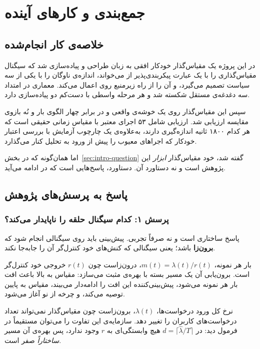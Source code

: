 \chapter{جمع‌بندی و کارهای آینده}
\label{ch:conclusion}

\section{خلاصه‌ی کار انجام‌شده}
\label{sec:conclusion-summary}

در این پروژه یک مقیاس‌گذار خودکار افقی به زبان  طراحی و پیاده‌سازی شد که سیگنال
مقیاس‌گذاری را با یک عبارت  پیکربندی‌پذیر از  می‌خواند، اندازه‌ی
ناوگان را با یکی از سه سیاست تصمیم می‌گیرد، و آن را از راه زیرمنبع  روی
 اعمال می‌کند. معماری در امتداد سه دغدغه‌ی مستقل شکسته شد و هر مرحله واسطی با
دست‌کم دو پیاده‌سازی دارد.

سپس این مقیاس‌گذار روی یک خوشه‌ی واقعی و در برابر چهار الگوی بار و نُه بازوی مقایسه ارزیابی
شد. ارزیابی شامل ۵۳ اجرای معتبر با مقیاس زمانی حقیقی است که هر کدام ۱۸۰۰ ثانیه اندازه‌گیری
دارند، به‌علاوه‌ی یک چارچوب آزمایش با بررسی اعتبار خودکار که اجراهای معیوب را پیش از ورود به
تحلیل کنار می‌گذارد.

اما همان‌گونه که در بخش~\ref{sec:intro-question} گفته شد، خود مقیاس‌گذار \emph{ابزار} این
پژوهش است و نه دستاورد آن. دستاورد، پاسخ‌هایی است که در ادامه می‌آید.

\section{پاسخ به پرسش‌های پژوهش}
\label{sec:conclusion-answers}

\subsection*{پرسش ۱: کدام سیگنال حلقه را ناپایدار می‌کند؟}

پاسخ ساختاری است و نه صرفاً تجربی. پیش‌بینی باید روی سیگنالی انجام شود که
\textbf{برون‌زا} باشد؛ یعنی سیگنالی که کنش‌های خود کنترل‌گر آن را جابه‌جا نکند.

بار هر نمونه، $m(t) = \lambda(t)/r(t)$، درون‌زاست چون $r(t)$ خروجی خود کنترل‌گر است.
برون‌یابی آن یک مسیر بسته با بهره‌ی مثبت می‌سازد: مقیاس به بالا باعث افت بار هر نمونه
می‌شود، پیش‌بینی‌کننده این افت را ادامه‌دار می‌بیند، مقیاس به پایین توصیه می‌کند، و چرخه از
نو آغاز می‌شود.

نرخ کل ورود درخواست‌ها، $\lambda(t)$، برون‌زاست چون مقیاس‌گذار نمی‌تواند تعداد درخواست‌های
کاربران را تغییر دهد. سازمایه‌ی این تفاوت را می‌توان مستقیماً در فرمول دید: در
$d = \lceil \hat{\lambda}/T \rceil$ هیچ وابستگی‌ای به $r$ وجود ندارد، پس بهره‌ی آن مسیر
\emph{ساختاراً} صفر است.

